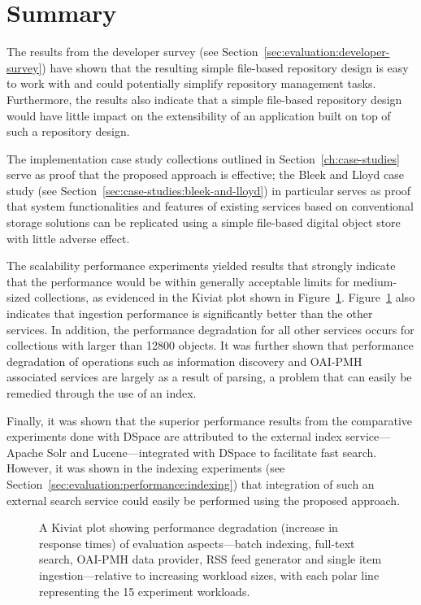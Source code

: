 \section{Summary}
\label{sec:evaluation-summary}

The results from the developer survey (see Section~\ref{sec:evaluation:developer-survey}) have shown that the resulting simple file-based repository design is easy to work with and could potentially simplify repository management tasks. Furthermore, the results also indicate that a simple file-based repository design would have little impact on the extensibility of an application built on top of such a repository design.

The implementation case study collections outlined in Section~\ref{ch:case-studies} serve as proof that the proposed approach is effective; the Bleek and Lloyd case study (see Section~\ref{sec:case-studies:bleek-and-lloyd}) in particular serves as proof that system functionalities and features of existing services based on conventional storage solutions can be replicated using a simple file-based digital object store with little adverse effect.

The scalability performance experiments yielded results that strongly indicate that the performance would be within generally acceptable limits for medium-sized collections, as evidenced in the Kiviat plot shown in Figure~\ref{fig:experimentation:performance:summary:kiviat}. Figure~\ref{fig:experimentation:performance:summary:kiviat} also indicates that ingestion performance is significantly better than the other services. In addition, the performance degradation for all other services occurs for collections with larger than \num{12800} objects. It was further shown that performance degradation of operations such as information discovery and OAI-PMH associated services are largely as a result of parsing, a problem that can easily be remedied through the use of an index. 

Finally, it was shown that the superior performance results from the comparative experiments done with DSpace are attributed to the external index service---Apache Solr and Lucene---integrated with DSpace to facilitate fast search. However, it was shown in the indexing experiments (see Section~\ref{sec:evaluation:performance:indexing}) that integration of such an external search service could easily be performed using the proposed approach.

\begin{figure}
 \centering
 \framebox[\textwidth]{%

 }
\caption[DL aspects performance summary]{A Kiviat plot showing performance degradation (increase in response times) of evaluation aspects---batch indexing, full-text search, OAI-PMH data provider, RSS feed generator and single item ingestion---relative to increasing workload sizes, with each polar line representing the \num{15} experiment workloads.}
 \label{fig:experimentation:performance:summary:kiviat}
\end{figure}


